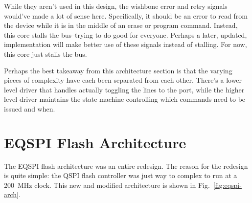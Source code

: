 \documentclass{gqtekspec}
\begin{document}
While they aren't used in this design, the wishbone error and retry signals
would've made a lot of sense here.  Specifically, it should be an error to
read from the device while it is in the middle of an erase or program command.
Instead, this core stalls the bus--trying to do good for everyone.  Perhaps
a later, updated, implementation will make better use of these signals instead
of stalling.  For now, this core just stalls the bus.

Perhaps the best takeaway from this architecture section is that the varying
pieces of complexity have each been separated from each other.  There's a
lower level driver that handles actually toggling the lines to the port,
while the higher level driver maintains the state machine controlling which
commands need to be issued and when.

\section{EQSPI Flash Architecture}
The EQSPI flash architecture was an entire redesign.  The reason for the 
redesign is quite simple: the QSPI flash controller was just way to complex
to run at a 200~MHz clock.  This new and modified architecture is shown in
Fig.~\ref{fig:eqspi-arch}.
\end{document}
